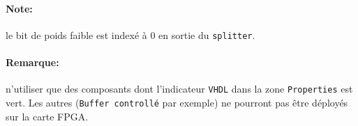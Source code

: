 \documentclass{article}
\begin{document}
    \paragraph{Note:} le bit de poids faible est indexé à 0 en sortie du \texttt{splitter}.

    \paragraph{Remarque:} n'utiliser que des composants dont l'indicateur \texttt{VHDL} dans la zone \texttt{Properties} est vert.
    Les autres (\texttt{Buffer controllé} par exemple) ne pourront pas être déployés sur la carte FPGA.
\end{document}
